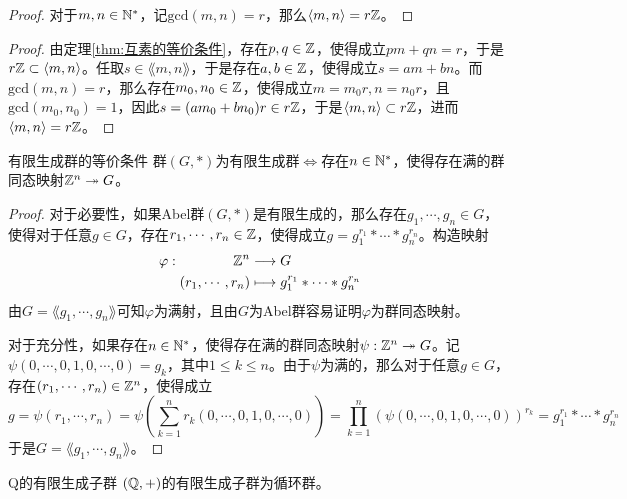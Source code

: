 \begin{proof}
	对于$m,n\in\mathbb{N}^*$，记$\mathrm{gcd}(m,n)=r$，那么$\langle m,n \rangle=r\mathbb{Z}$。
\end{proof}

\begin{proof}
	由定理\ref{thm:互素的等价条件}，存在$p,q\in\mathbb{Z}$，使得成立$pm+qn=r$，于是$r\mathbb{Z} \subset \langle m,n \rangle$。任取$s\in \lang m,n \rang$，于是存在$a,b\in\mathbb{Z}$，使得成立$s=am+bn$。而$\mathrm{gcd}(m,n)=r$，那么存在$m_0,n_0\in\mathbb{Z}$，使得成立$m=m_0r,n=n_0r$，且$\mathrm{gcd}(m_0,n_0)=1$，因此$s=(am_0+bn_0)r\in r\mathbb{Z}$，于是$\langle m,n \rangle \subset r\mathbb{Z}$，进而$\langle m,n \rangle=r\mathbb{Z}$。
\end{proof}

\begin{proposition}{有限生成群的等价条件}
	群$(G,*)$为有限生成群$\iff$存在$n\in\mathbb{N}^*$，使得存在满的群同态映射$\mathbb{Z}^n\twoheadrightarrow G$。
\end{proposition}

\begin{proof}
	对于必要性，如果Abel群$(G,*)$是有限生成的，那么存在$g_1,\cdots,g_n\in G$，使得对于任意$g\in G$，存在$r_1,\cdots,r_n\in\mathbb{Z}$，使得成立$g=g_1^{r_1}*\cdots*g_n^{r_n}$。构造映射
	\begin{align*}
		\varphi:\begin{aligned}[t]
			\mathbb{Z}^n&\longrightarrow G\\
			(r_1,\cdots,r_n)&\longmapsto g_1^{r_1}*\cdots*g_n^{r_n}
		\end{aligned}
	\end{align*}
	由$G=\lang g_1,\cdots,g_n \rang$可知$\varphi$为满射，且由$G$为Abel群容易证明$\varphi$为群同态映射。
	
	对于充分性，如果存在$n\in\mathbb{N}^*$，使得存在满的群同态映射$\psi:\mathbb{Z}^n\twoheadrightarrow G$。记$\psi(0,\cdots,0,1,0,\cdots,0)=g_k$，其中$1\le k \le n$。由于$\psi$为满的，那么对于任意$g\in G$，存在$(r_1,\cdots,r_n)\in\mathbb{Z}^n$，使得成立
	$$
	g=\psi(r_1,\cdots,r_n)=\psi\left(\sum_{k=1}^{n}r_k(0,\cdots,0,1,0,\cdots,0)\right)=\prod_{k=1}^{n}(\psi(0,\cdots,0,1,0,\cdots,0))^{r_k}=g_1^{r_1}*\cdots*g_n^{r_n}
	$$
	于是$G=\lang g_1,\cdots,g_n \rang$。
\end{proof}

\begin{proposition}{}{Q的有限生成子群}
	$(\mathbb{Q},+)$的有限生成子群为循环群。
\end{proposition}

